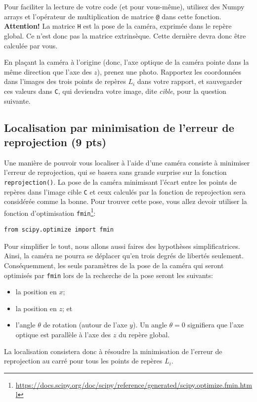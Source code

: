 \documentclass[12pt]{article}
\begin{document}
Pour faciliter la lecture de votre code (et pour vous-même), utilisez des Numpy arrays et l'opérateur de multiplication de matrice \texttt{@} dans cette fonction.
{\bf Attention!} La matrice \texttt{H} est la pose de la caméra, exprimée dans le repère global. Ce n'est donc pas la matrice extrinsèque. Cette dernière devra donc être calculée par vous.

En plaçant la caméra à l'origine (donc, l'axe optique de la caméra pointe dans la même direction que l'axe des $z$), prenez une photo. Rapportez les coordonnées dans l'images des trois points de repères $L_i$ dans votre rapport, et sauvegarder ces valeurs dans \texttt{C}, qui deviendra votre image, dite \emph{cible}, pour la question suivante.

\subsection{Localisation par minimisation de l'erreur de reprojection (9 pts)}
Une manière de pouvoir vous localiser à l'aide d'une caméra consiste à minimiser l'erreur de reprojection, qui se basera sans grande surprise sur la fonction  \texttt{reprojection()}. La pose de la caméra minimisant l'écart entre les points de repères dans l'image cible \texttt{C} et ceux calculés par la fonction de reprojection sera considérée comme la bonne. Pour trouver cette pose, vous allez devoir utiliser la fonction d'optimisation \texttt{fmin}\footnote{\url{https://docs.scipy.org/doc/scipy/reference/generated/scipy.optimize.fmin.html}}:
\begin{verbatim}
from scipy.optimize import fmin
\end{verbatim}
Pour simplifier le tout, nous allons aussi faires des hypothèses simplificatrices. Ainsi, la caméra ne pourra se déplacer qu'en trois degrés de libertés seulement. Conséquemment, les seuls paramètres de la pose de la caméra qui seront optimisés par \texttt{fmin} lors de la recherche de la pose seront les suivants:
\begin{itemize}
    \item la position en $x$;
    \item la position en $z$; et
    \item l'angle $\theta$ de rotation (autour de l'axe $y$). Un angle $\theta=0$ signifiera que l'axe optique est parallèle à l'axe des $z$ du repère global.
\end{itemize}
La localisation consistera donc à résoudre la minimisation de l'erreur de reprojection au carré pour tous les points de repères $L_i$.
\end{document}
